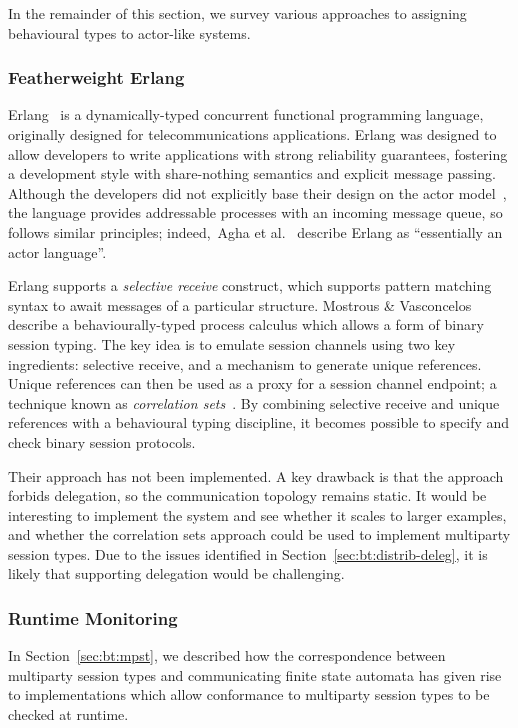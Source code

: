 \documentclass[
graybox,
envcountchap
]{svmult}
\begin{document}
\begin{bibunit}
  In the remainder of this section, we survey various approaches to assigning
  behavioural types to actor-like systems.

  \subsubsection{Featherweight Erlang}
  Erlang~\cite{Armstrong10:erlang} is a dynamically-typed concurrent functional
  programming language, originally designed for telecommunications applications.
  Erlang was designed to allow developers to write applications with strong
  reliability guarantees, fostering a development style with share-nothing
  semantics and explicit message passing.
  Although the developers did not
  explicitly base their design on the actor model~\cite{erlang-not-actor}, the
  language provides addressable processes with an incoming message queue, so
  follows similar principles; indeed,~Agha et
  al.~\cite{AghaMST97:foundation-actor} describe Erlang as ``essentially
  an actor language''.

  Erlang supports a \emph{selective receive} construct, which supports pattern
  matching syntax to await messages of a particular structure.
  Mostrous \& Vasconcelos~\cite{MostrousV11:session-erlang} describe a
  behaviourally-typed process calculus which allows a form of binary session
  typing. The key idea is to emulate session channels using two key ingredients:
  selective receive, and a mechanism to generate unique references. Unique
  references can then be used as a proxy for a session channel endpoint; a
  technique known as \emph{correlation sets}~\cite{Viroli04a:correlation}. By
  combining selective receive and unique references with a behavioural typing
  discipline, it becomes possible to specify and check binary session protocols.

  Their approach has not been implemented. A key drawback is that the approach
  forbids delegation, so the communication topology remains static. It would be
  interesting to implement the system and see whether it scales to larger
  examples, and whether the correlation sets approach could be used to implement
  multiparty session types. Due to the issues identified in
  Section~\ref{sec:bt:distrib-deleg}, it is likely that supporting
  delegation would be challenging.

  \subsubsection{Runtime Monitoring}
  In Section~\ref{sec:bt:mpst}, we described how the correspondence between
  multiparty session types and communicating finite state automata has given
  rise to implementations which allow conformance to multiparty session types to
  be checked at runtime.


\end{bibunit}
\end{document}
